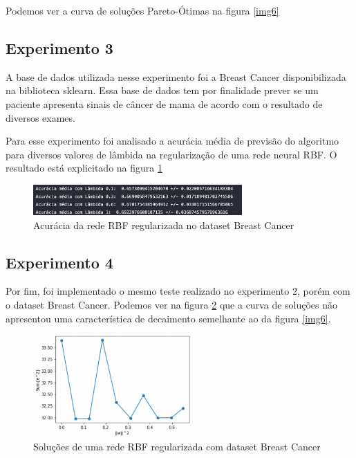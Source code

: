 Podemos ver a curva de soluções Pareto-Ótimas na figura \ref*{img6}



\subsection*{Experimento 3}

A base de dados utilizada nesse experimento foi a Breast Cancer disponibilizada na biblioteca sklearn. Essa base de dados tem por finalidade
prever se um paciente apresenta sinais de câncer de mama de acordo com o resultado de diversos exames.

Para esse experimento foi analisado a acurácia média de previsão do algoritmo para diversos valores de lâmbida na regularização de uma rede neural RBF.
O resultado está explicitado na figura \ref*{img7}

\begin{figure}[H]
    \center
    \includegraphics[width=8cm]{images/img7.png}
    \caption{\label{img7}Acurácia da rede RBF regularizada no dataset Breast Cancer}
\end{figure}




\subsection*{Experimento 4}

Por fim, foi implementado o mesmo teste realizado no experimento 2, porém com o dataset Breast Cancer.
Podemos ver na figura \ref*{img8} que a curva de soluções não apresentou uma característica de decaimento semelhante ao da figura \ref*{img6}.

\begin{figure}[H]
    \center
    \includegraphics[width=6cm]{images/img8.png}
    \caption{\label{img8}Soluções de uma rede RBF regularizada com dataset Breast Cancer}
\end{figure}